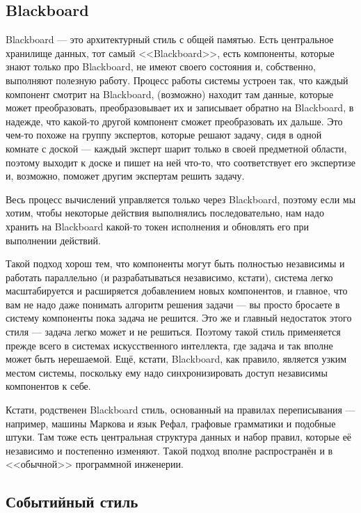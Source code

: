 \documentclass{../../text-style}
\begin{document}
\subsection{Blackboard}

Blackboard --- это архитектурный стиль с общей памятью. Есть центральное хранилище данных, тот самый <<Blackboard>>, есть компоненты, которые знают только про Blackboard, не имеют своего состояния и, собственно, выполняют полезную работу. Процесс работы системы устроен так, что каждый компонент смотрит на Blackboard, (возможно) находит там данные, которые может преобразовать, преобразовывает их и записывает обратно на Blackboard, в надежде, что какой-то другой компонент сможет преобразовать их дальше. Это чем-то похоже на группу экспертов, которые решают задачу, сидя в одной комнате с доской --- каждый эксперт шарит только в своей предметной области, поэтому выходит к доске и пишет на ней что-то, что соответствует его экспертизе и, возможно, поможет другим экспертам решить задачу. 

Весь процесс вычислений управляется только через Blackboard, поэтому если мы хотим, чтобы некоторые действия выполнялись последовательно, нам надо хранить на Blackboard какой-то токен исполнения и обновлять его при выполнении действий.

Такой подход хорош тем, что компоненты могут быть полностью независимы и работать параллельно (и разрабатываться независимо, кстати), система легко масштабируется и расширяется добавлением новых компонентов, и главное, что вам не надо даже понимать алгоритм решения задачи --- вы просто бросаете в систему компоненты пока задача не решится. Это же и главный недостаток этого стиля --- задача легко может и не решиться. Поэтому такой стиль применяется прежде всего в системах искусственного интеллекта, где задача и так вполне может быть нерешаемой. Ещё, кстати, Blackboard, как правило, является узким местом системы, поскольку ему надо синхронизировать доступ независимы компонентов к себе.

Кстати, родственен Blackboard стиль, основанный на правилах переписывания --- например, машины Маркова и язык Рефал, графовые грамматики и подобные штуки. Там тоже есть центральная структура данных и набор правил, которые её независимо и постепенно изменяют. Такой подход вполне распространён и в <<обычной>> программной инженерии.

\subsection{Событийный стиль}
\end{document}
